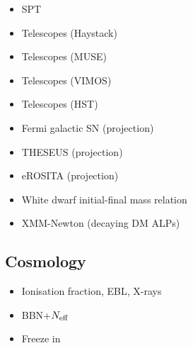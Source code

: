 \documentclass[8pt,twocolumn]{extarticle}
\begin{document}
\begin{mdframed}[everyline=true]
\begin{itemize}
    \item SPT~\cite{SPT-3G:2022ods}
    \item Telescopes (Haystack)~\cite{Blout:2000uc}
    \item Telescopes (MUSE)~\cite{Regis:2020fhw}
    \item Telescopes (VIMOS)~\cite{Grin:2006aw}
    \item Telescopes (HST)~\cite{Nakayama:2022jza,Carenza:2023qxh}
    \item Fermi galactic SN (projection)~\cite{Meyer:2016wrm}
     \item THESEUS (projection)~\cite{Thorpe-Morgan:2020rwc}
    \item eROSITA (projection)~\cite{Dekker:2021bos}
   \item White dwarf initial-final mass relation~\cite{Dolan:2021rya}
   \item XMM-Newton (decaying DM ALPs)~\cite{Foster:2021ngm}
\end{itemize}
\vspace{-2.5em}
\subsection*{Cosmology}\vspace{-0.5em}
\begin{itemize}\setlength\itemsep{-0.5em}
    \item Ionisation fraction, EBL, X-rays~\cite{Cadamuro:2011fd}
    \item BBN+$N_{\rm eff}$~\cite{Depta:2020wmr}
    \item Freeze in~\cite{Langhoff:2022bij}
\end{itemize}
\end{mdframed}

\newpage
\end{document}
